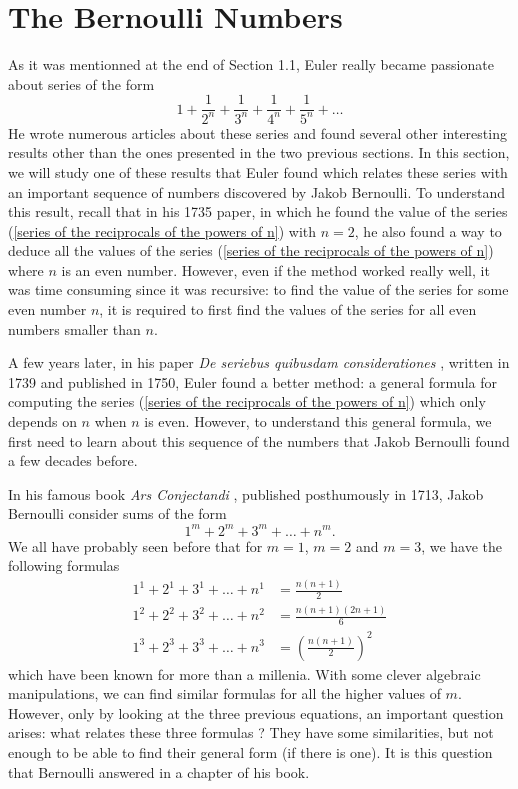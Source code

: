 \section{The Bernoulli Numbers}

As it was mentionned at the end of Section 1.1, Euler really became passionate about series of the form
\begin{equation}\label{series of the reciprocals of the powers of n}
    1 + \frac{1}{2^n} + \frac{1}{3^n} + \frac{1}{4^n} + \frac{1}{5^n} + \dots
\end{equation}
He wrote numerous articles about these series and found several other interesting results other than the ones presented in the two previous sections. In this section, we will study one of these results that Euler found which relates these series with an important sequence of numbers discovered by Jakob Bernoulli. To understand this result, recall that in his 1735 paper, in which he found the value of the series (\ref{series of the reciprocals of the powers of n}) with $n = 2$, he also found a way to deduce all the values of the series (\ref{series of the reciprocals of the powers of n}) where $n$ is an even number. However, even if the method worked really well, it was time consuming since it was recursive: to find the value of the series for some even number $n$, it is required to first find the values of the series for all even numbers smaller than $n$.

A few years later, in his paper \textit{De seriebus quibusdam considerationes} \cite{euler1750seriebus}, written in 1739 and published in 1750, Euler found a better method: a general formula for computing the series (\ref{series of the reciprocals of the powers of n}) which only depends on $n$ when $n$ is even. However, to understand this general formula, we first need to learn about this sequence of the numbers that Jakob Bernoulli found a few decades before.

In his famous book \textit{Ars Conjectandi} \cite{bernoulli1713ars}, published posthumously in 1713, Jakob Bernoulli consider sums of the form
$$1^m + 2^m + 3^m + \dots + n^m.$$
We all have probably seen before that for $m=1$, $m = 2$ and $m=3$, we have the following formulas
\begin{align*}
    1^1 + 2^1 + 3^1 + \dots + n^1 &= \frac{n(n+1)}{2} \\
    1^2 + 2^2 + 3^2 + \dots + n^2 &= \frac{n(n+1)(2n+1)}{6} \\
    1^3 + 2^3 + 3^3 + \dots + n^3 &= \left(\frac{n(n+1)}{2}\right)^2
\end{align*}
which have been known for more than a millenia. With some clever algebraic manipulations, we can find similar formulas for all the higher values of $m$. However, only by looking at the three previous equations, an important question arises: what relates these three formulas ? They have some similarities, but not enough to be able to find their general form (if there is one). It is this question that Bernoulli answered in a chapter of his book.

